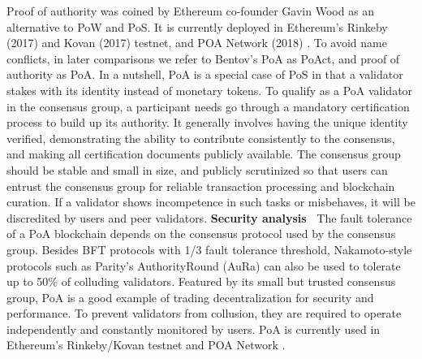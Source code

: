 \label{subsec:PoA}
Proof of authority was coined by Ethereum co-founder Gavin Wood as an alternative to PoW and PoS. It is currently deployed in Ethereum's Rinkeby (2017) and Kovan (2017) testnet, and POA Network (2018) . To avoid name conflicts, in later comparisons we refer to Bentov's PoA as PoAct, and proof of authority as PoA. In a nutshell, PoA is a special case of PoS in that a validator stakes with its identity instead of monetary tokens. To qualify as a PoA validator in the consensus group, a participant needs go through a mandatory certification process to build up its authority. It generally involves having the unique identity verified, demonstrating the ability to contribute consistently to the consensus, and making all certification documents publicly available. The consensus group should be stable and small in size, and publicly scrutinized so that users can entrust the consensus group for reliable transaction processing and blockchain curation. If a validator shows incompetence in such tasks or misbehaves, it will be discredited by users and peer validators.
\textbf{Security analysis~} The fault tolerance of a PoA blockchain depends on the consensus protocol used by the consensus group. Besides BFT protocols with 1/3 fault tolerance threshold, Nakamoto-style protocols such as Parity's AuthorityRound (AuRa)  can also be used to tolerate up to 50\% of colluding validators. 
Featured by its small but trusted consensus group, PoA is a good example of trading decentralization for security and performance. To prevent validators from collusion, they are required to operate independently and constantly monitored by users. PoA is currently used in Ethereum's Rinkeby/Kovan testnet and POA Network .

